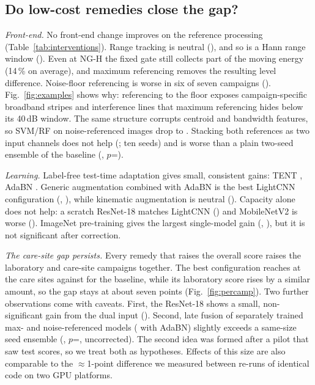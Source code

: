 \documentclass[11pt,a4paper]{article}
\begin{document}
\subsection{Do low-cost remedies close the gap?}
\emph{Front-end.} No front-end change improves on the reference processing (Table~\ref{tab:interventions}). Range tracking is neutral (\TRACKDELTA{}), and so is a Hann range window (\HANNDELTA{}). Even at NG-H the fixed gate still collects part of the moving energy (14\,\% on average), and maximum referencing removes the resulting level difference. Noise-floor referencing is worse in six of seven campaigns (\NFDELTA{}). Fig.~\ref{fig:examples} shows why: referencing to the floor exposes campaign-specific broadband stripes and interference lines that maximum referencing hides below its 40\,dB window. The same structure corrupts centroid and bandwidth features, so SVM/RF on noise-referenced images drop to \NFSVM{}. Stacking both references as two input channels does not help (\DUALDELTA{}; ten seeds) and is worse than a plain two-seed ensemble of the baseline (\DUALVSENS{}, $p$=\DUALVSENSP{}).

\emph{Learning.} Label-free test-time adaptation gives small, consistent gains: TENT \TENTDELTA{}, AdaBN \ADADELTA{}. Generic augmentation combined with AdaBN is the best LightCNN configuration (\AUGADAF{}, \AUGADADELTA{}), while kinematic augmentation is neutral (\KINDELTA{}). Capacity alone does not help: a scratch ResNet-18 matches LightCNN (\RESDELTA{}) and MobileNetV2 is worse (\MOBDELTA{}). ImageNet pre-training gives the largest single-model gain (\INF{}, \INDELTA{}), but it is not significant after correction.

\emph{The care-site gap persists.} Every remedy that raises the overall score raises the laboratory and care-site campaigns together. The best configuration reaches \AUGADACARE{} at the care sites against \PROTCARE{} for the baseline, while its laboratory score rises by a similar amount, so the gap stays at about seven points (Fig.~\ref{fig:percamp}). Two further observations come with caveats. First, the ResNet-18 shows a small, non-significant gain from the dual input (\DUALRES{}). Second, late fusion of separately trained max- and noise-referenced models (\LFADA{} with AdaBN) slightly exceeds a same-size seed ensemble (\LFVSENS{}, $p$=\LFVSENSP{}, uncorrected). The second idea was formed after a pilot that saw test scores, so we treat both as hypotheses. Effects of this size are also comparable to the $\approx$1-point difference we measured between re-runs of identical code on two GPU platforms.
\end{document}
